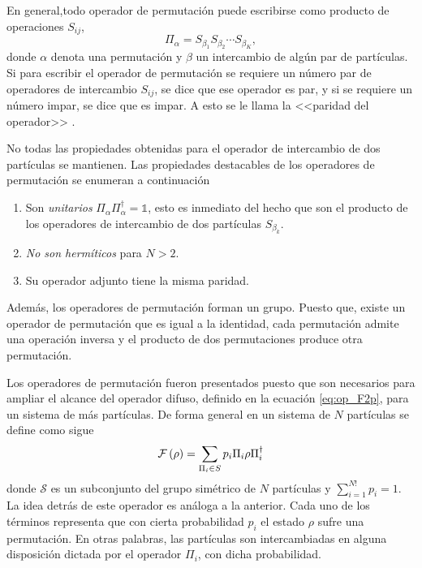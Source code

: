 En general,todo operador de permutación puede escribirse como producto de operaciones $S_{ij}$, \begin{equation}\label{eq:permutation_operator}\Pi_{\alpha}=S_{\beta_1}S_{\beta_2}\cdots S_{\beta_K}, \end{equation} donde $\alpha$ denota una permutación y $\beta$ un intercambio de algún par de partículas. Si para escribir el operador de permutación se requiere un número par de operadores de intercambio $S_{ij}$, se dice que ese operador es par, y si se requiere un número impar, se dice que es impar. A esto se le llama la <<paridad del operador>> {\cite{cohen1977quantum}}. 


No todas las propiedades obtenidas para el operador de intercambio de dos partículas se mantienen. Las propiedades destacables de los operadores de permutación se enumeran a continuación 
\begin{enumerate}
    \item Son \textit{unitarios} $\Pi_\alpha\Pi_\alpha^{\dagger}=\mathds{1}$, esto es inmediato del hecho que son el producto de los operadores de intercambio de dos partículas $S_{\beta_k}$.
    \item \textit{No son hermíticos} para $N>2$. 
    \item Su operador adjunto tiene la misma paridad.

\end{enumerate}

Además, los operadores de permutación forman un grupo. Puesto que, existe un operador de permutación que es igual a la identidad, cada permutación admite una operación inversa y el producto de dos permutaciones produce otra permutación.


Los operadores de permutación fueron presentados puesto que son necesarios para ampliar el alcance del operador difuso, definido en la ecuación {\eqref{eq:op_F2p}}, para un sistema de más partículas. De forma general en un sistema de $N$ partículas se define como sigue\begin{equation}\label{eq:fuzzy-op-nparticles}
    \mathcal{F}\left(\rho\right)=\sum_{\Pi_i\in S}p_{i}\Pi_{i}\rho\Pi_{i}^{\dagger}
 \end{equation}donde $\mathcal{S}$ es un subconjunto del grupo simétrico de $N$ partículas y $\sum_{i=1}^{N!} p_i=1$.  La idea detrás de este operador es análoga a la anterior. Cada uno de los términos representa que con cierta probabilidad $p_i$ el estado $\rho$ sufre una permutación. En otras palabras, las partículas son intercambiadas en alguna disposición dictada por el operador $\Pi_{i}$, con dicha probabilidad.






